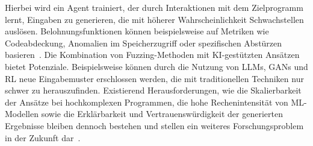 Hierbei wird ein Agent trainiert, der durch Interaktionen mit dem Zielprogramm lernt, Eingaben zu generieren, die mit
höherer Wahrscheinlichkeit Schwachstellen auslösen.
Belohnungsfunktionen können beispielsweise auf Metriken wie Codeabdeckung, Anomalien im Speicherzugriff oder spezifischen
Abstürzen basieren~\cite{paduraru_riverfuzzrl_2021}.\newline
Die Kombination von Fuzzing-Methoden mit KI-gestützten Ansätzen bietet Potenziale.
Beispielsweise können durch die Nutzung von LLMs, GANs und RL neue Eingabemuster erschlossen werden, die mit traditionellen Techniken
nur schwer zu herauszufinden.
Existierend Herausforderungen, wie die Skalierbarkeit der Ansätze bei hochkomplexen Programmen, die hohe Rechenintensität von
ML-Modellen sowie die Erklärbarkeit und Vertrauenswürdigkeit der generierten Ergebnisse bleiben dennoch bestehen und
stellen ein weiteres Forschungsproblem in der Zukunft dar~\cite{ramadan_role_2024}.